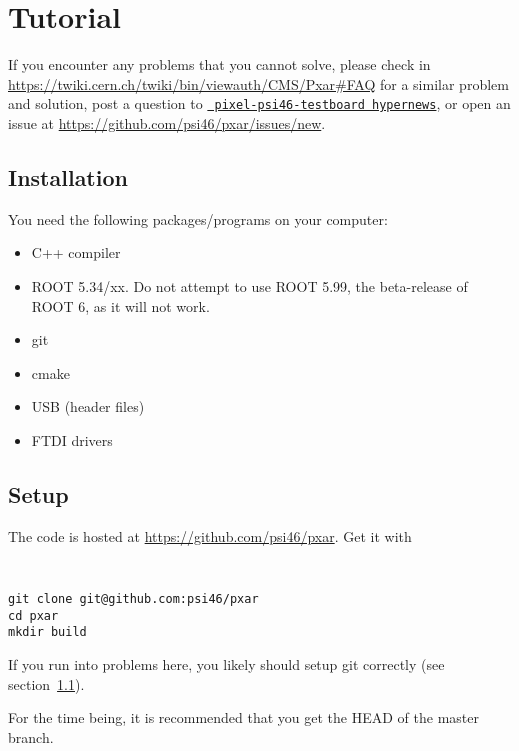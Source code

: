 \section{Tutorial}
\label{s:tutorial}

If you encounter any problems that you cannot solve, please check in 
\url{https://twiki.cern.ch/twiki/bin/viewauth/CMS/Pxar#FAQ} for a
similar problem and solution, post a question to
\href{https://hypernews.cern.ch/HyperNews/CMS/get/pixel-psi46-testboard.html}{\tt
  pixel-psi46-testboard hypernews}, or open an issue at \url{https://github.com/psi46/pxar/issues/new}.

\subsection{Installation}
\label{ss:installation}

You need the following packages/programs on your computer: 
\begin{itemize}
  \item C++ compiler
  \item ROOT 5.34/xx. Do not attempt to use ROOT 5.99, the
    beta-release of ROOT 6, as it will not work. 
  \item git
  \item cmake
  \item USB (header files)
  \item FTDI drivers
\end{itemize}

\subsection{Setup}
\label{ss:setup}
The \pxar code is hosted at \url{https://github.com/psi46/pxar}. Get it with 
{\tt
\begin{verbatim}
git clone git@github.com:psi46/pxar 
cd pxar
mkdir build
\end{verbatim}
}
If you run into problems here, you likely should setup git correctly
(see section~\ref{ss:installation}). 

For the time being, it is recommended that you get the HEAD of the
master branch. 


